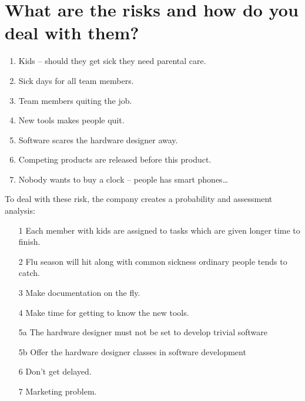 \section{What are the risks and how do you deal with them?}

\begin{enumerate}
	\item Kids -- should they get sick they need parental care.
	\item Sick days for all team members.
	\item Team members quiting the job.
	\item New tools makes people quit.
	\item Software scares the hardware designer away.
	\item Competing products are released before this product.
	\item Nobody wants to buy a clock -- people has smart phones\dots
\end{enumerate}
To deal with these risk, the company creates a probability and assessment analysis:

\begin{itemize}
	\item[1] Each member with kids are assigned to tasks which are given longer time to finish.
	\item[2] Flu season will hit along with common sickness ordinary people tends to catch.
	\item[3] Make documentation on the fly.
	\item[4] Make time for getting to know the new tools.
	\item[5a] The hardware designer must not be set to develop trivial software
	\item[5b] Offer the hardware designer classes in software development
	\item[6] Don't get delayed.
	\item[7] Marketing problem.
\end{itemize}